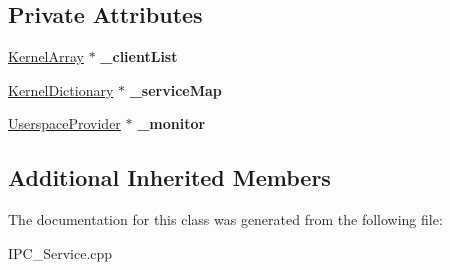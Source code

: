 \subsection*{Private Attributes}
\begin{DoxyCompactItemize}
\item 
\mbox{\label{class_i_p_c___service_1_1_actual_userspace_provider_a7f4aeb528e64d2d2fe8fdbb2c37f2955}} 
\hyperlink{class_kernel_array}{Kernel\+Array} $\ast$ {\bfseries \+\_\+client\+List}
\item 
\mbox{\label{class_i_p_c___service_1_1_actual_userspace_provider_abb248dc9a45587ca57312567c0a64d9f}} 
\hyperlink{class_kernel_dictionary}{Kernel\+Dictionary} $\ast$ {\bfseries \+\_\+service\+Map}
\item 
\mbox{\label{class_i_p_c___service_1_1_actual_userspace_provider_a93bed89a71e39e57af21b58652bd7343}} 
\hyperlink{class_i_p_c___service_1_1_userspace_provider}{Userspace\+Provider} $\ast$ {\bfseries \+\_\+monitor}
\end{DoxyCompactItemize}
\subsection*{Additional Inherited Members}


The documentation for this class was generated from the following file\+:\begin{DoxyCompactItemize}
\item 
I\+P\+C\+\_\+\+Service.\+cpp\end{DoxyCompactItemize}

